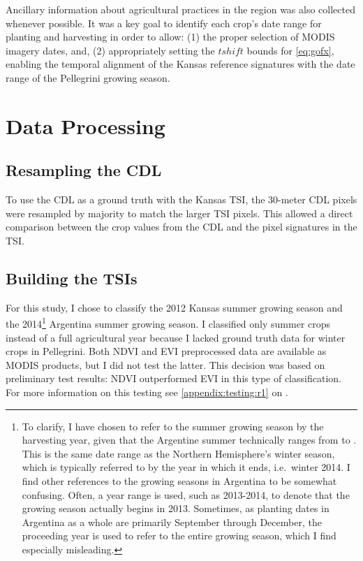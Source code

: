 Ancillary information about agricultural practices in the region was also collected whenever possible. It was a key goal to identify each crop's date range for planting and harvesting in order to allow: (1) the proper selection of MODIS imagery dates, and, (2) appropriately setting the $tshift$ bounds for \autoref{eq:gofx}, enabling the temporal alignment of the Kansas reference signatures with the date range of the Pellegrini growing season.

\section{Data Processing}

\subsection{Resampling the CDL}

To use the CDL as a ground truth with the Kansas TSI, the 30-meter CDL pixels were resampled by majority to match the larger TSI pixels. This allowed a direct comparison between the crop values from the CDL and the pixel signatures in the TSI.

\subsection{Building the TSIs}
\label{buildingTSIs}

For this study, I chose to classify the 2012 Kansas summer growing season and the 2014\footnote{To clarify, I have chosen to refer to the summer growing season by the harvesting year, given that the Argentine summer technically ranges from  to . This is the same date range as the Northern Hemisphere's winter season, which is typically referred to by the year in which it ends, i.e.\ winter 2014. I find other references to the growing seasons in Argentina to be somewhat confusing. Often, a year range is used, such as 2013-2014, to denote that the growing season actually begins in 2013. Sometimes, as planting dates in Argentina as a whole are primarily September through December, the proceeding year is used to refer to the entire growing season, which I find especially misleading.} Argentina summer growing season. I classified only summer crops instead of a full agricultural year because I lacked ground truth data for winter crops in Pellegrini.  Both NDVI and EVI preprocessed data are available as MODIS products, but I did not test the latter. This decision was based on preliminary test results: NDVI outperformed EVI in this type of classification. For more information on this testing see \autoref{appendix:testing:r1} on .

